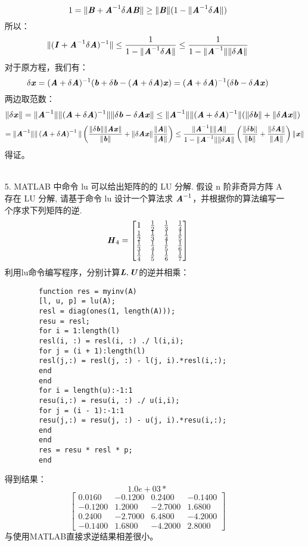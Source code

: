 \documentclass{article}
\newcommand{\xc}[1]{\textbf{\emph{#1}}}
\begin{document}
\begin{itemize}
		$$
			1 = \|\xc{B} + \xc{A}^{-1}\delta\xc{A}\xc{B}\| \ge \|\xc{B}\|(1 - \|\xc{A}^{-1}\delta\xc{A}\|)
		$$
		所以：
		$$
			\|(\xc{I} + \xc{A}^{-1}\delta\xc{A})^{-1}\|\le\frac{1}{1 - \|\xc{A}^{-1}\delta\xc{A}\|}\le\frac{1}{1 - \|\xc{A}^{-1}\|\|\delta\xc{A}\|}
		$$
		对于原方程，我们有：
		$$
			\delta\xc{x} = 	(\xc{A}+\delta\xc{A})^{-1}(\xc{b} + \delta\xc{b} - (\xc{A}+\delta\xc{A})\xc{x}) = (\xc{A}+\delta\xc{A})^{-1}(\delta\xc{b} - \delta\xc{A}\xc{x})
		$$
		两边取范数：
		$$
				\|\delta\xc{x}\| = \|\xc{A}^{-1}\|\|(\xc{A}+\delta\xc{A})^{-1}\|\|\delta\xc{b} - \delta\xc{A}\xc{x}\|\le \|\xc{A}^{-1}\|\|(\xc{A}+\delta\xc{A})^{-1}\|(\|\delta\xc{b}\| +\|\delta\xc{A}\xc{x}\|)
		$$
		$$
				 = \|\xc{A}^{-1}\|\|\left(\xc{A}+\delta\xc{A}\right)^{-1}\|\left(\frac{\|\delta\xc{b}\|\|\xc{A}\xc{x}\|}{\|\xc{b}\|} +\|\delta\xc{A}\xc{x}\|\frac{\|\xc{A}\|}{\|\xc{A}\|}\right)\le\frac{\|\xc{A}^{-1}\|\|\xc{A}\|}{1 - \|\xc{A}^{-1}\|\|\delta\xc{A}\|}\left(\frac{\|\delta\xc{b}\|}{\|\xc{b}\|}+ \frac{\|\delta\xc{A}\|}{\|\xc{A}\|}\right)\|\xc{x}\|
		$$
		得证。\\
		\\
		\item[5.]MATLAB 中命令 lu 可以给出矩阵的的 LU 分解. 假设 n 阶非奇异方阵 A 存在 LU 分解, 请基于命令 lu 设计一个算法求 $\xc{A}^{-1}$，并根据你的算法编写一个序求下列矩阵的逆.
		$$
			\xc{H}_4= \begin{bmatrix}
			1&\frac{1}{2}&\frac{1}{3}&\frac{1}{4}\\
			\frac{1}{2}&\frac{1}{3}&\frac{1}{4} & \frac{1}{5}\\
			\frac{1}{3}&\frac{1}{4} & \frac{1}{5} & \frac{1}{6}\\
			\frac{1}{4} & \frac{1}{5} & \frac{1}{6} & \frac{1}{7}
			\end{bmatrix}
		$$
		利用lu命令编写程序，分别计算$\xc{L},\xc{U}$的逆并相乘：
		\begin{lstlisting}
		function res = myinv(A)
		[l, u, p] = lu(A);
		resl = diag(ones(1, length(A)));
		resu = resl;
		for i = 1:length(l)
		resl(i, :) = resl(i, :) ./ l(i,i);
		for j = (i + 1):length(l)
		resl(j,:) = resl(j, :) - l(j, i).*resl(i,:);
		end
		end
		for i = length(u):-1:1
		resu(i,:) = resu(i, :) ./ u(i,i);
		for j = (i - 1):-1:1
		resu(j,:) = resu(j, :) - u(j, i).*resu(i,:);
		end
		end
		res = resu * resl * p;
		end
		\end{lstlisting}
		得到结果：
		$$
		1.0e+03 *
		$$
		$$\begin{bmatrix}
		0.0160  & -0.1200 &   0.2400  & -0.1400\\
		-0.1200 &   1.2000  & -2.7000 &   1.6800\\
		0.2400  & -2.7000  &  6.4800   &-4.2000\\
		-0.1400  &  1.6800 &  -4.2000 &   2.8000
		\end{bmatrix}
		$$
		与使用MATLAB直接求逆结果相差很小。
		\end{itemize}
\end{document}
